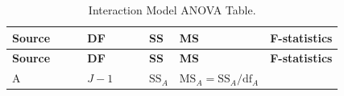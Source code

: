 \documentclass[]{book}
\theoremstyle{definition}
\theoremstyle{definition}
\theoremstyle{remark}
\begin{document}
\begin{longtable}[]{@{}lllll@{}}
\caption{\label{tab:Table4-1} Interaction Model ANOVA Table.}\tabularnewline
\toprule
\begin{minipage}[b]{0.16\columnwidth}\raggedright\strut
\textbf{Source}~~~~\strut
\end{minipage} & \begin{minipage}[b]{0.17\columnwidth}\raggedright\strut
\textbf{DF}~~~~~\strut
\end{minipage} & \begin{minipage}[b]{0.19\columnwidth}\raggedright\strut
\textbf{SS}\strut
\end{minipage} & \begin{minipage}[b]{0.21\columnwidth}\raggedright\strut
\textbf{MS}\strut
\end{minipage} & \begin{minipage}[b]{0.12\columnwidth}\raggedright\strut
\textbf{F-statistics}\strut
\end{minipage}\tabularnewline
\midrule
\endfirsthead
\toprule
\begin{minipage}[b]{0.16\columnwidth}\raggedright\strut
\textbf{Source}~~~~\strut
\end{minipage} & \begin{minipage}[b]{0.17\columnwidth}\raggedright\strut
\textbf{DF}~~~~~\strut
\end{minipage} & \begin{minipage}[b]{0.19\columnwidth}\raggedright\strut
\textbf{SS}\strut
\end{minipage} & \begin{minipage}[b]{0.21\columnwidth}\raggedright\strut
\textbf{MS}\strut
\end{minipage} & \begin{minipage}[b]{0.12\columnwidth}\raggedright\strut
\textbf{F-statistics}\strut
\end{minipage}\tabularnewline
\midrule
\endhead
\begin{minipage}[t]{0.16\columnwidth}\raggedright\strut
A\strut
\end{minipage} & \begin{minipage}[t]{0.17\columnwidth}\raggedright\strut
\(J-1\)\strut
\end{minipage} & \begin{minipage}[t]{0.19\columnwidth}\raggedright\strut
\(\text{SS}_A\)\strut
\end{minipage} & \begin{minipage}[t]{0.21\columnwidth}\raggedright\strut
\(\text{MS}_A=\text{SS}_A/\text{df}_A\)\strut

\end{minipage}
\end{longtable}
\end{document}
